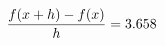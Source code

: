 \documentclass[preview]{standalone}
\begin{document}
\begin{align*}
\special{dvisvgm:raw <g id='unique000'>}\frac{f(x+h)-f(x)}{h} = 3.658\special{dvisvgm:raw </g>}
\end{align*}
\end{document}

